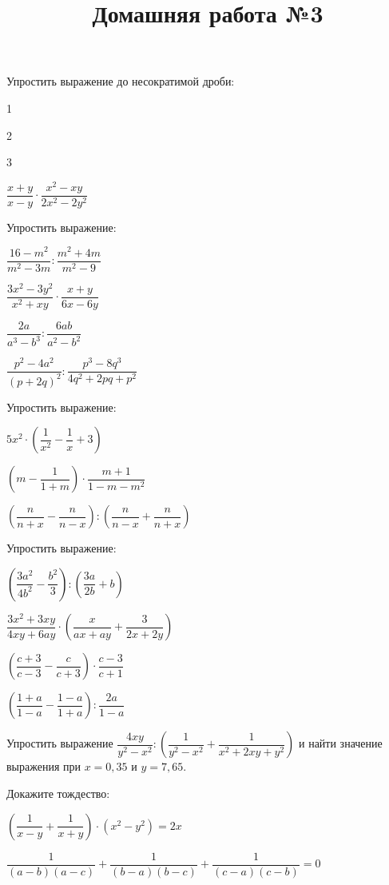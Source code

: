 \newpage
\title{Домашняя работа №3}
\begin{listofex}
	\item Упростить выражение до несократимой дроби:
	\begin{enumcols}[itemcolumns=4]
		\item 1
		\item 2
		\item 3
		\item \( \dfrac{x+y}{x-y}\cdot\dfrac{x^2-xy}{2x^2-2y^2} \)
	\end{enumcols}
	\item Упростить выражение:
	\begin{enumcols}[itemcolumns=3]
		\item \( \dfrac{16-m^2}{m^2-3m}:\dfrac{m^2+4m}{m^2-9} \)
		\item \( \dfrac{3x^2-3y^2}{x^2+xy}\cdot\dfrac{x+y}{6x-6y} \)
		\item \( \dfrac{2a}{a^3-b^3}:\dfrac{6ab}{a^2-b^2} \)
		\item \( \dfrac{p^2-4a^2}{(p+2q)^2}:\dfrac{p^3-8q^3}{4q^2+2pq+p^2} \)
	\end{enumcols}
	\item Упростить выражение:
	\begin{enumcols}[itemcolumns=2]
		\item \( 5x^2\cdot\left( \dfrac{1}{x^2}-\dfrac{1}{x}+3 \right) \)
		\item \( \left( m-\dfrac{1}{1+m} \right)\cdot\dfrac{m+1}{1-m-m^2} \)
		\item \( \left( \dfrac{n}{n+x}-\dfrac{n}{n-x} \right):\left( \dfrac{n}{n-x}+\dfrac{n}{n+x} \right) \)
	\end{enumcols}
	\item Упростить выражение:
	\begin{enumcols}[itemcolumns=2]
		\item \( \left( \dfrac{3a^2}{4b^2}-\dfrac{b^2}{3} \right):\left( \dfrac{3a}{2b}+b \right) \)
		\item \( \dfrac{3x^2+3xy}{4xy+6ay}\cdot\left( \dfrac{x}{ax+ay}+\dfrac{3}{2x+2y} \right) \)
		\item \( \left( \dfrac{c+3}{c-3}-\dfrac{c}{c+3} \right)\cdot\dfrac{c-3}{c+1} \)
		\item \( \left( \dfrac{1+a}{1-a}-\dfrac{1-a}{1+a} \right):\dfrac{2a}{1-a} \)
	\end{enumcols}
	\item Упростить выражение \( \dfrac{4xy}{y^2-x^2}:\left( \dfrac{1}{y^2-x^2}+\dfrac{1}{x^2+2xy+y^2} \right) \) и найти значение выражения при \( x=0,35 \) и \( y=7,65 \).
	\item Докажите тождество:
	\begin{enumcols}[itemcolumns=1]
		\item \( \left( \dfrac{1}{x-y}+\dfrac{1}{x+y} \right)\cdot(x^2-y^2)=2x \)
		\item \( \dfrac{1}{(a-b)(a-c)}+\dfrac{1}{(b-a)(b-c)}+\dfrac{1}{(c-a)(c-b)}=0 \)
	\end{enumcols}
\end{listofex}
